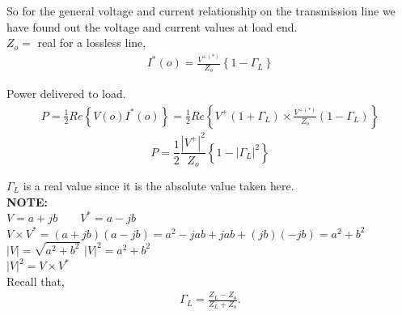 So for the general voltage and current relationship on the transmission line we have found  out the voltage and current values at load end.\\

$Z_o= $ real for a lossless line,\\
\begin{align*}
I^\ast (o) =\frac{V^{+ (\ast )}}{Z_o}\left\lbrace 1 -\Gamma_L \right\rbrace
\end{align*}

Power delivered to load.
\begin{align*}
P= \frac{1}{2} Re\left\lbrace V(o) I^*(o) \right\rbrace = \frac{1}{2} Re\left\lbrace V^+(1+\Gamma_L) \times \frac{V^{+(*)}}{Z_o} (1-\Gamma_L)\right\rbrace
\end{align*}
\begin{equation}
P= \frac{1}{2} \frac{|V^+|^2}{Z_o} \left\lbrace 1 -|\Gamma_L|^2 \right\rbrace 
\end{equation}

$\Gamma_L$ is a real value since it is the absolute value taken here.\\

 \textbf{NOTE:}  \\

 $V= a + jb  \quad \quad V^*= a -jb$\\

$ V\times V^* = ( a + jb)(a-jb)= a^2 - jab + jab + (jb) (-jb)= a^2 + b^2 $ \\

$| V |= \sqrt{a^2 + b^2} $ \quad \quad $|V|^2 = a^2 + b^2 $ \\

$| V |^2 = V \times V^* $ \\

Recall that,
\begin{align*}\Gamma_L = \frac{ Z_L -Z_o }{ Z_L + Z_o }.
\end{align*}

